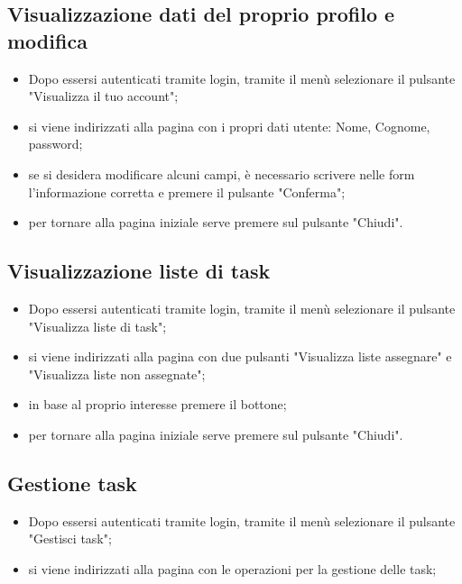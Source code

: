 \subsection{Visualizzazione dati del proprio profilo e modifica}
\begin{itemize}
    \item Dopo essersi autenticati tramite login, tramite il menù selezionare il pulsante "Visualizza il tuo account";
    \item si viene indirizzati alla pagina con i propri dati utente: Nome, Cognome, password;
    \item se si desidera modificare alcuni campi, è necessario scrivere nelle form l'informazione corretta e premere il pulsante "Conferma";
    \item per tornare alla pagina iniziale serve premere sul pulsante "Chiudi".
\end{itemize}

\subsection{Visualizzazione liste di task}
\begin{itemize}
    \item Dopo essersi autenticati tramite login, tramite il menù selezionare il pulsante "Visualizza liste di task";
    \item si viene indirizzati alla pagina con due pulsanti "Visualizza liste assegnare" e "Visualizza liste non assegnate";
    \item in base al proprio interesse premere il bottone;
    \item per tornare alla pagina iniziale serve premere sul pulsante "Chiudi".
\end{itemize}

\subsection{Gestione task}
\begin{itemize}
    \item Dopo essersi autenticati tramite login, tramite il menù selezionare il pulsante "Gestisci task";
    \item si viene indirizzati alla pagina con le operazioni per la gestione delle task;
\end{itemize}
